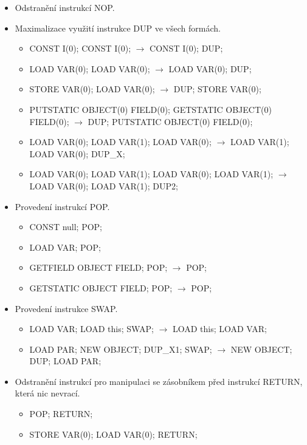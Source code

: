 \begin{itemize}
\item Odstranění instrukcí NOP.

\item Maximalizace využití instrukce DUP ve všech formách.
\begin{itemize}
\item CONST I(0); CONST I(0); $\rightarrow$ CONST I(0); DUP;
\item LOAD VAR(0); LOAD VAR(0); $\rightarrow$ LOAD VAR(0); DUP;
\item STORE VAR(0); LOAD VAR(0); $\rightarrow$ DUP; STORE VAR(0);
\item PUTSTATIC OBJECT(0) FIELD(0); GETSTATIC OBJECT(0) FIELD(0); $\rightarrow$ DUP; PUTSTATIC OBJECT(0) FIELD(0);
\item LOAD VAR(0); LOAD VAR(1); LOAD VAR(0); $\rightarrow$ LOAD VAR(1); LOAD VAR(0); DUP\_X;
\item LOAD VAR(0); LOAD VAR(1); LOAD VAR(0); LOAD VAR(1); $\rightarrow$ LOAD VAR(0); LOAD VAR(1); DUP2;
\end{itemize}

\item Provedení instrukcí POP.
\begin{itemize}
\item CONST null; POP;
\item LOAD VAR; POP;
\item GETFIELD OBJECT FIELD; POP; $\rightarrow$ POP;
\item GETSTATIC OBJECT FIELD; POP; $\rightarrow$ POP;
\end{itemize}

\item Provedení instrukce SWAP.
\begin{itemize}
\item LOAD VAR; LOAD this; SWAP; $\rightarrow$ LOAD this; LOAD VAR;
\item LOAD PAR; NEW OBJECT; DUP\_X1; SWAP; $\rightarrow$ NEW OBJECT; DUP; LOAD PAR;
\end{itemize}

\item Odstranění instrukcí pro manipulaci se zásobníkem před instrukcí RETURN, která nic nevrací.
\begin{itemize}
\item POP; RETURN;
\item STORE VAR(0); LOAD VAR(0); RETURN; 
\end{itemize}

\end{itemize}


